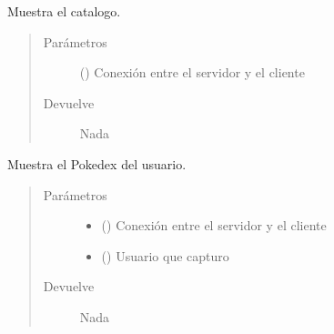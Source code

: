\documentclass[letterpaper,10pt,spanish,openany,oneside]{sphinxmanual}
\begin{document}
\begin{fulllineitems}
\label{\detokenize{pokemonServer:pokemonServer.muestraCatalogo}}
Muestra el catalogo.
\begin{quote}\begin{description}
\item[{Parámetros}] \leavevmode
{} () \textendash{} Conexión entre el servidor y el cliente

\item[{Devuelve}] \leavevmode
Nada

\end{description}\end{quote}

\end{fulllineitems}


\begin{fulllineitems}
\label{\detokenize{pokemonServer:pokemonServer.muestraPokedex}}
Muestra el Pokedex del usuario.
\begin{quote}\begin{description}
\item[{Parámetros}] \leavevmode\begin{itemize}
\item {} 
 () \textendash{} Conexión entre el servidor y el cliente

\item {} 
 () \textendash{} Usuario que capturo

\end{itemize}

\item[{Devuelve}] \leavevmode
Nada

\end{description}\end{quote}

\end{fulllineitems}
\end{document}
